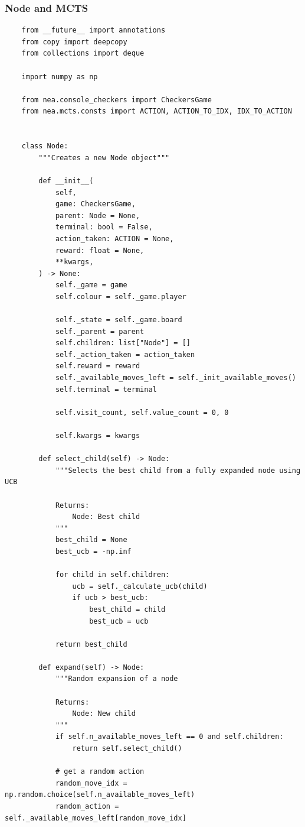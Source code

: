 \documentclass{article}
\begin{document}
    \subsubsection{Node and MCTS}
    \begin{verbatim}
    from __future__ import annotations
    from copy import deepcopy
    from collections import deque

    import numpy as np

    from nea.console_checkers import CheckersGame
    from nea.mcts.consts import ACTION, ACTION_TO_IDX, IDX_TO_ACTION


    class Node:
        """Creates a new Node object"""

        def __init__(
            self,
            game: CheckersGame,
            parent: Node = None,
            terminal: bool = False,
            action_taken: ACTION = None,
            reward: float = None,
            **kwargs,
        ) -> None:
            self._game = game
            self.colour = self._game.player

            self._state = self._game.board
            self._parent = parent
            self.children: list["Node"] = []
            self._action_taken = action_taken
            self.reward = reward
            self._available_moves_left = self._init_available_moves()
            self.terminal = terminal

            self.visit_count, self.value_count = 0, 0

            self.kwargs = kwargs

        def select_child(self) -> Node:
            """Selects the best child from a fully expanded node using UCB

            Returns:
                Node: Best child
            """
            best_child = None
            best_ucb = -np.inf

            for child in self.children:
                ucb = self._calculate_ucb(child)
                if ucb > best_ucb:
                    best_child = child
                    best_ucb = ucb

            return best_child

        def expand(self) -> Node:
            """Random expansion of a node

            Returns:
                Node: New child
            """
            if self.n_available_moves_left == 0 and self.children:
                return self.select_child()

            # get a random action
            random_move_idx = np.random.choice(self.n_available_moves_left)
            random_action = self._available_moves_left[random_move_idx]


\end{verbatim}
\end{document}
